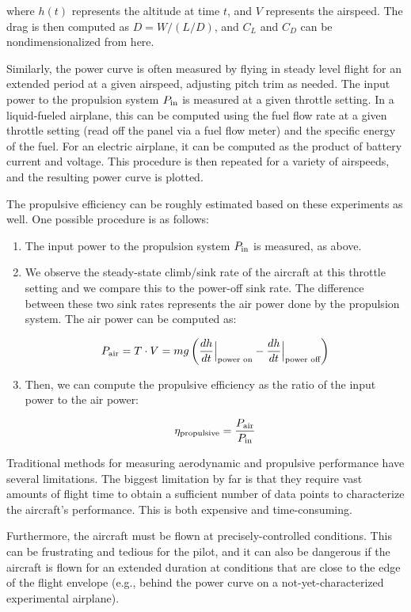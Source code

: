 \documentclass[conf]{new-aiaa}
\begin{document}
    where $h(t)$ represents the altitude at time $t$, and $V$ represents the airspeed. The drag is then computed as $D = W / (L/D)$, and $C_L$ and $C_D$ can be nondimensionalized from here.

    Similarly, the power curve is often measured by flying in steady level flight for an extended period at a given airspeed, adjusting pitch trim as needed. The input power to the propulsion system $P_{\rm in}$ is measured at a given throttle setting. In a liquid-fueled airplane, this can be computed using the fuel flow rate at a given throttle setting (read off the panel via a fuel flow meter) and the specific energy of the fuel. For an electric airplane, it can be computed as the product of battery current and voltage. This procedure is then repeated for a variety of airspeeds, and the resulting power curve is plotted.

    The propulsive efficiency can be roughly estimated based on these experiments as well. One possible procedure is as follows:

    \begin{enumerate}
        \item The input power to the propulsion system $P_{\rm in}$ is measured, as above.
        \item We observe the steady-state climb/sink rate of the aircraft at this throttle setting and we compare this to the power-off sink rate. The difference between these two sink rates represents the air power done by the propulsion system. The air power can be computed as:

        $$P_{\rm air}=T \cdot V = m g \left( \frac{dh}{dt}\Big |_\text{power on} - \frac{dh}{dt}\Big |_\text{power off} \right)$$

        \item Then, we can compute the propulsive efficiency as the ratio of the input power to the air power:

        $$\eta_{\rm propulsive} = \frac{P_{\rm air}}{P_{\rm in}}$$

    \end{enumerate}

    Traditional methods for measuring aerodynamic and propulsive performance have several limitations. The biggest limitation by far is that they require vast amounts of flight time to obtain a sufficient number of data points to characterize the aircraft's performance. This is both expensive and time-consuming.

    Furthermore, the aircraft must be flown at precisely-controlled conditions. This can be frustrating and tedious for the pilot, and it can also be dangerous if the aircraft is flown for an extended duration at conditions that are close to the edge of the flight envelope (e.g., behind the power curve on a not-yet-characterized experimental airplane).
\end{document}
